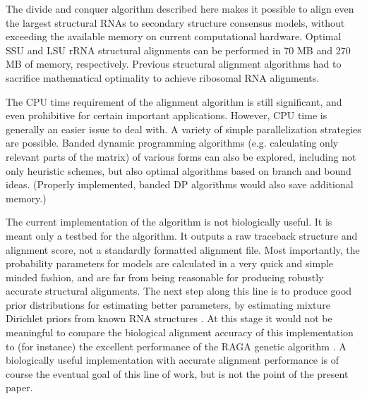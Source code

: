 \documentclass[11pt]{article}
\begin{document}
The divide and conquer algorithm described here makes it possible to
align even the largest structural RNAs to secondary structure
consensus models, without exceeding the available memory on current
computational hardware. Optimal SSU and LSU rRNA structural alignments
can be performed in 70 MB and 270 MB of memory, respectively. Previous
structural alignment algorithms had to sacrifice mathematical
optimality to achieve ribosomal RNA alignments.

The CPU time requirement of the alignment algorithm is still
significant, and even prohibitive for certain important
applications. However, CPU time is generally an easier issue to deal
with. A variety of simple parallelization strategies are
possible. Banded dynamic programming algorithms (e.g. calculating only
relevant parts of the matrix) of various forms can also be explored,
including not only heuristic schemes, but also optimal algorithms
based on branch and bound ideas. (Properly implemented, banded DP
algorithms would also save additional memory.)

The current implementation of the algorithm is not biologically
useful. It is meant only a testbed for the algorithm. It outputs a raw
traceback structure and alignment score, not a standardly formatted
alignment file. Most importantly, the probability parameters for
models are calculated in a very quick and simple minded fashion, and
are far from being reasonable for producing robustly accurate
structural alignments. The next step along this line is to produce
good prior distributions for estimating better parameters, by
estimating mixture Dirichlet priors from known RNA structures
\cite{Sjolander96}.  At this stage it would not be meaningful to
compare the biological alignment accuracy of this implementation to
(for instance) the excellent performance of the RAGA genetic algorithm
\cite{Notredame97}.  A biologically useful implementation with
accurate alignment performance is of course the eventual goal of this
line of work, but is not the point of the present paper.


\end{document}
